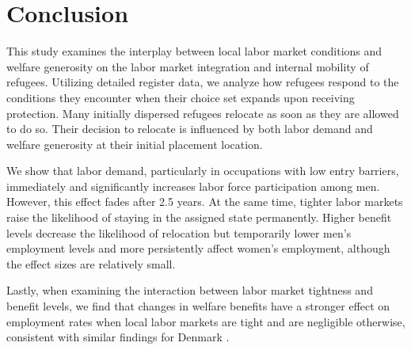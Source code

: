 


\FloatBarrier
\section{\label{sec:conclusion}Conclusion}

This study examines the interplay between local labor market conditions and welfare generosity on the labor market integration and internal mobility of refugees. Utilizing detailed register data, we analyze how refugees respond to the conditions they encounter when their choice set expands upon receiving protection.
Many initially dispersed refugees relocate as soon as they are allowed to do so. Their decision to relocate is influenced by both labor demand and welfare generosity at their initial placement location.

We show that labor demand, particularly in occupations with low entry barriers, immediately and significantly increases labor force participation among men. However, this effect fades after 2.5 years. At the same time, tighter labor markets raise the likelihood of staying in the assigned state permanently.
Higher benefit levels decrease the likelihood of relocation but temporarily lower men’s employment levels and more persistently affect women’s employment, although the effect sizes are relatively small.

Lastly, when examining the interaction between labor market tightness and benefit levels, we find that changes in welfare benefits have a stronger effect on employment rates when local labor markets are tight and are negligible otherwise, consistent with similar findings for Denmark \citep{dustmann2024}.

